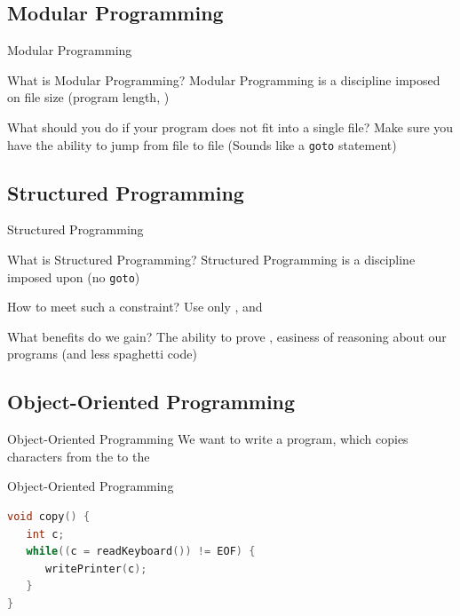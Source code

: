 \subsection{Modular Programming}
\begin{frame}{Modular Programming}
\begin{block}{What is Modular Programming?}
Modular Programming is  a discipline imposed on file size (program length,
)
\end{block}
\pause
\begin{block}{What should you do if your program does not fit into a single
file?}
Make sure you have the ability to jump from file to file (Sounds like a
\lstinline!goto! statement)
\end{block}
\end{frame}

\subsection{Structured Programming}
\begin{frame}{Structured Programming}
\begin{block}{What is Structured Programming?}
Structured Programming is a discipline imposed upon  (no \lstinline!goto!)
\end{block}
\pause
\begin{block}{How to meet such a constraint?}
Use only ,  and
\end{block}
\pause
\begin{block}{What benefits do we gain?}
The ability to prove , easiness of
reasoning about our programs (and less spaghetti code)
\end{block}
\end{frame}

\subsection{Object-Oriented Programming}
\begin{frame}{Object-Oriented Programming}
We want to write a program, which copies characters from the
 to the 
\end{frame}

\begin{frame}[fragile]{Object-Oriented Programming}
\begin{lstlisting}[language=c]
void copy() {
   int c;
   while((c = readKeyboard()) != EOF) {
      writePrinter(c);
   }
}
\end{lstlisting}
\end{frame}

